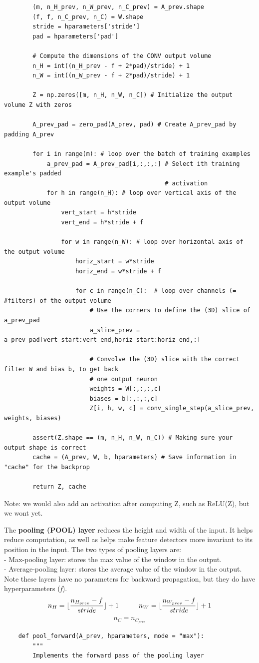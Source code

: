 \documentclass[11pt, a4paper]{article}
\begin{document}
\begin{spacing}{1.1}
\begin{lstlisting}
		(m, n_H_prev, n_W_prev, n_C_prev) = A_prev.shape
		(f, f, n_C_prev, n_C) = W.shape
		stride = hparameters['stride']
		pad = hparameters['pad']
		
		# Compute the dimensions of the CONV output volume
		n_H = int((n_H_prev - f + 2*pad)/stride) + 1
		n_W = int((n_W_prev - f + 2*pad)/stride) + 1
		
		Z = np.zeros([m, n_H, n_W, n_C]) # Initialize the output volume Z with zeros
		
		A_prev_pad = zero_pad(A_prev, pad) # Create A_prev_pad by padding A_prev
		
		for i in range(m): # loop over the batch of training examples
			a_prev_pad = A_prev_pad[i,:,:,:] # Select ith training example's padded 
			                                 # activation
			for h in range(n_H): # loop over vertical axis of the output volume
				vert_start = h*stride
				vert_end = h*stride + f
				
				for w in range(n_W): # loop over horizontal axis of the output volume
					horiz_start = w*stride
					horiz_end = w*stride + f
					
					for c in range(n_C):  # loop over channels (= #filters) of the output volume
						# Use the corners to define the (3D) slice of a_prev_pad
						a_slice_prev = a_prev_pad[vert_start:vert_end,horiz_start:horiz_end,:]
						
						# Convolve the (3D) slice with the correct filter W and bias b, to get back
						# one output neuron
						weights = W[:,:,:,c]
						biases = b[:,:,:,c]
						Z[i, h, w, c] = conv_single_step(a_slice_prev, weights, biases)
			
		assert(Z.shape == (m, n_H, n_W, n_C)) # Making sure your output shape is correct
		cache = (A_prev, W, b, hparameters) # Save information in "cache" for the backprop
		
		return Z, cache	\end{lstlisting} \vspace*{1mm}
	Note: we would also add an activation after computing Z, such as ReLU(Z), but we wont yet. \newpage

	\noindent The \textbf{pooling (POOL) layer} reduces the height and width of the input. It helps reduce computation, as well as helps make feature detectors more invariant to its position in the input. The two types of pooling layers are: \\	
	- Max-pooling layer: stores the max value of the window in the output.\\
	- Average-pooling layer: stores the average value of the window in the output. \\
	Note these layers have no parameters for backward propagation, but they do have hyperparameters (\textit{f}).
	$$ n_H = \lfloor \frac{n_{H_{prev}} - f}{stride} \rfloor +1 \hspace*{10mm} n_W = \lfloor \frac{n_{W_{prev}} - f}{stride} \rfloor +1 $$
	$$ n_C = n_{C_{prev}}$$
	\begin{lstlisting}
	def pool_forward(A_prev, hparameters, mode = "max"):
		"""
		Implements the forward pass of the pooling layer
		

\end{lstlisting}
\end{spacing}
\end{document}
